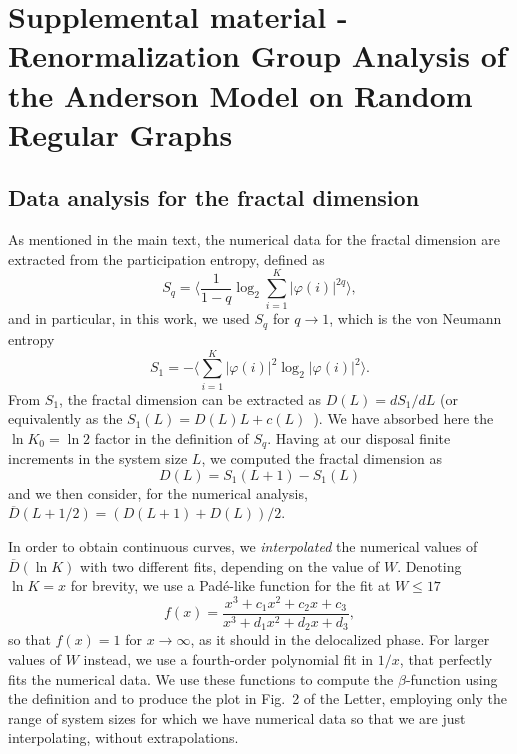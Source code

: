 \documentclass[reprint,aps,prl,superscriptaddress,english,nolongbibliography]{revtex4-1}
\begin{document}



\pagebreak
\widetext
\newpage


\section{Supplemental material - Renormalization Group Analysis of the Anderson Model on Random Regular Graphs}

\subsection*{Data analysis for the fractal dimension}

As mentioned in the main text, the numerical data for the fractal dimension are extracted from the participation entropy, defined as
\begin{equation}
    S_q = \Big\langle \frac{1}{1-q}  \log_2 \sum_{i=1}^{K} |\varphi(i)|^{2q} \Big\rangle,
\end{equation}
and in particular, in this work, we used $S_q$ for $q\to 1$, which is the von Neumann entropy
\begin{equation}
\label{eq:vonNeumann}
    S_1 = - \Big \langle \sum_{i=1}^{K}  |\varphi(i)|^{2} \log_2 |\varphi(i)|^{2} \Big\rangle.
\end{equation}
From $S_1$, the fractal dimension can be extracted as $D(L)=d S_1 /dL$ (or equivalently as the $S_1(L) = D(L)L + c(L)$~\cite{sierant2023universality}). We have absorbed here the $\ln K_0 = \ln 2$ factor in the definition of $S_q$.
Having at our disposal finite increments in the system size $L$, we computed the fractal dimension as
\begin{equation}
    D(L) = S_1(L+1)-S_1(L)
\end{equation}
and we then consider, for the numerical analysis, $\overline{D}(L+1/2) = (D(L+1)+D(L))/2$.

In order to obtain continuous curves, we \emph{interpolated} the numerical values of $\overline{D}(\ln K)$ with two different fits, depending on the value of $W$. Denoting $\ln K=x$ for brevity, we use a Pad\'e-like function for the fit at $W\leq 17$  
\begin{equation}
    f(x) = \frac{x^3 + c_1 x^2 + c_2 x + c_3}{x^3 + d_1 x^2 + d_2 x + d_3},
\end{equation}
so that $f(x)=1$ for $x \to \infty$, as it should in the delocalized phase. For larger values of $W$ instead, we use a fourth-order polynomial fit in $1/x$, that perfectly fits the numerical data. We use these functions to compute the $\beta$-function using the definition and to produce the plot in Fig.~2 of the Letter, employing only the range of system sizes for which we have numerical data so that we are just interpolating, without extrapolations.
\end{document}
